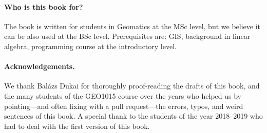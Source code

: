 \paragraph*{Who is this book for?}
The book is written for students in Geomatics at the MSc level, but we believe it can be also used at the BSc level.
Prerequisites are: GIS, background in linear algebra, programming course at the introductory level.


\paragraph*{Acknowledgements.}
We thank Balázs Dukai for thoroughly proof-reading the drafts of this book, and the many students of the GEO1015 course over the years who helped us by pointing---and often fixing with a pull request---the errors, typos, and weird sentences of this book. 
A special thank to the students of the year 2018--2019 who had to deal with the first version of this book.






